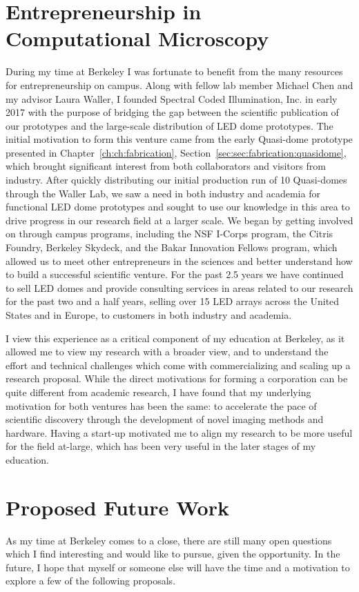 \section{Entrepreneurship in Computational Microscopy}
During my time at Berkeley I was fortunate to benefit from the many resources for entrepreneurship on campus. Along with fellow lab member Michael Chen and my advisor Laura Waller, I founded Spectral Coded Illumination, Inc. in early 2017 with the purpose of bridging the gap between the scientific publication of our prototypes and the large-scale distribution of LED dome prototypes. The initial motivation to form this venture came from the early Quasi-dome prototype presented in Chapter~\ref{ch:ch:fabrication}, Section~\ref{sec:sec:fabrication:quasidome}, which brought significant interest from both collaborators and visitors from industry. After quickly distributing our initial production run of 10 Quasi-domes through the Waller Lab, we saw a need in both industry and academia for functional LED dome prototypes and sought to use our knowledge in this area to drive progress in our research field at a larger scale. We began by getting involved on through campus programs, including the NSF I-Corps program, the Citris Foundry, Berkeley Skydeck, and the Bakar Innovation Fellows program, which allowed us to meet other entrepreneurs in the sciences and better understand how to build a successful scientific venture. For the past 2.5 years we have continued to sell LED domes and provide consulting services in areas related to our research for the past two and a half years, selling over 15 LED arrays across the United States and in Europe, to customers in both industry and academia.

I view this experience as a critical component of my education at Berkeley, as it allowed me to view my research with a broader view, and to understand the effort and technical challenges which come with commercializing and scaling up a research proposal. While the direct motivations for forming a corporation can be quite different from academic research, I have found that my underlying motivation for both ventures has been the same: to accelerate the pace of scientific discovery through the development of novel imaging methods and hardware. Having a start-up motivated me to align my research to be more useful for the field at-large, which has been very useful in the later stages of my education.

\section{Proposed Future Work}
As my time at Berkeley comes to a close, there are still many open questions which I find interesting and would like to pursue, given the opportunity. In the future, I hope that myself or someone else will have the time and a motivation to explore a few of the following proposals.

